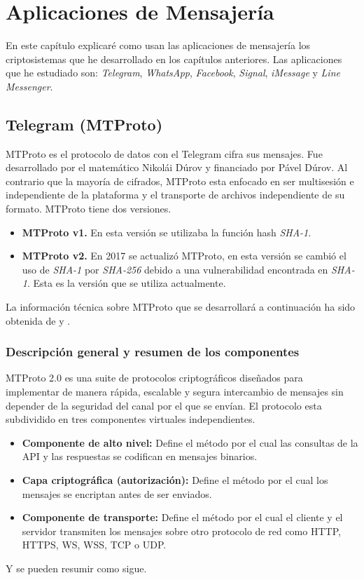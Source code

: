\chapter{Aplicaciones de Mensajería}
\label{chap:siete}

En este capítulo explicaré como usan las aplicaciones de mensajería los criptosistemas que he desarrollado en los capítulos anteriores. Las aplicaciones que he estudiado son: \emph{Telegram}, \emph{WhatsApp}, \emph{Facebook}, \emph{Signal}, \emph{iMessage} y \emph{Line Messenger}.

\section{Telegram (MTProto)}
MTProto es el protocolo de datos con el Telegram cifra sus mensajes. Fue desarrollado por el matemático Nikolái Dúrov y financiado por Pável Dúrov. Al contrario que la mayoría de cifrados, MTProto esta enfocado en ser multisesión e independiente de la plataforma y el transporte de archivos independiente de su formato. MTProto tiene dos versiones.
\begin{itemize}
	\item \textbf{MTProto v1.} En esta versión se utilizaba la función hash \emph{SHA-1}.
	\item \textbf{MTProto v2.} En 2017 se actualizó MTProto, en esta versión se cambió el uso de \emph{SHA-1} por \emph{SHA-256} debido a una vulnerabilidad encontrada en \emph{SHA-1}. Esta es la versión que se utiliza actualmente. 
\end{itemize}
La información técnica sobre MTProto que se desarrollará a continuación ha sido obtenida de \cite{Miculan2021} y \cite{WebProto}.

\subsection{Descripción general y resumen de los componentes}
MTProto 2.0 es una suite de protocolos criptográficos diseñados para implementar de manera rápida, escalable y segura intercambio de mensajes sin depender de la seguridad del canal por el que se envían.
El protocolo esta subdividido en tres componentes virtuales independientes.
\begin{itemize}
	\item \textbf{Componente de alto nivel:} Define el método por el cual las consultas de la API y las respuestas se codifican en mensajes binarios. 
	\item \textbf{Capa criptográfica (autorización):} Define el método por el cual los mensajes se encriptan antes de ser enviados.
	\item \textbf{Componente de transporte:} Define el método por el cual el cliente y el servidor transmiten los mensajes sobre otro protocolo de red como HTTP, HTTPS, WS, WSS, TCP o UDP.
\end{itemize}
Y se pueden resumir como sigue.

